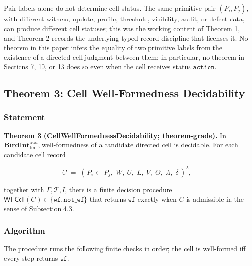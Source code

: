 \documentclass[11pt]{article}
\theoremstyle{definition}
\begin{document}
Pair labels alone do not determine cell status. The same primitive pair \((P_i,P_j)\), with different witness, update, profile, threshold, visibility, audit, or defect data, can produce different cell statuses; this was the working content of Theorem 1, and Theorem 2 records the underlying typed-record discipline that licenses it. No theorem in this paper infers the equality of two primitive labels from the existence of a directed-cell judgment between them; in particular, no theorem in Sections 7, 10, or 13 does so even when the cell receives status \(\texttt{action}\).

\subsection{Theorem 3: Cell Well-Formedness Decidability}

\subsubsection{Statement}

\textbf{Theorem 3 (CellWellFormednessDecidability; theorem-grade).} In \(\mathbf{BirdInt}^{\mathrm{aud}}_{\mathrm{fin}}\), well-formedness of a candidate directed cell is decidable. For each candidate cell record

\[
C\;=\;(\,P_i\leftarrow P_j,\;W,\;U,\;L,\;V,\;\Theta,\;A,\;\delta\,)^{\lambda},
\]

together with \(\Gamma,\mathcal T,I\), there is a finite decision procedure \(\mathsf{WFCell}(C)\in\{\texttt{wf},\texttt{not\_wf}\}\) that returns \(\texttt{wf}\) exactly when \(C\) is admissible in the sense of Subsection 4.3.

\subsubsection{Algorithm}

The procedure runs the following finite checks in order; the cell is well-formed iff every step returns \(\texttt{wf}\).
\end{document}
